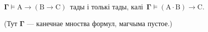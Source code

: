 \begin{problemList}
\begin{belarusianEnumerate}
\item $\boldsymbol{\Gamma} \vDash \boldsymbol{\mathrm{A}} \to (\boldsymbol{\mathrm{B}}
\to \boldsymbol{\mathrm{C}})$\, тады і толькі тады, калі\, $\boldsymbol{\Gamma} \vDash (\boldsymbol{\mathrm{A}} \cdot \boldsymbol{\mathrm{B}}) \to \boldsymbol{\mathrm{C}}$.

\end{belarusianEnumerate}

(Тут $\boldsymbol{\Gamma}$ --- канечнае мноства формул, магчыма пустое.) \\

\end{problemList}


